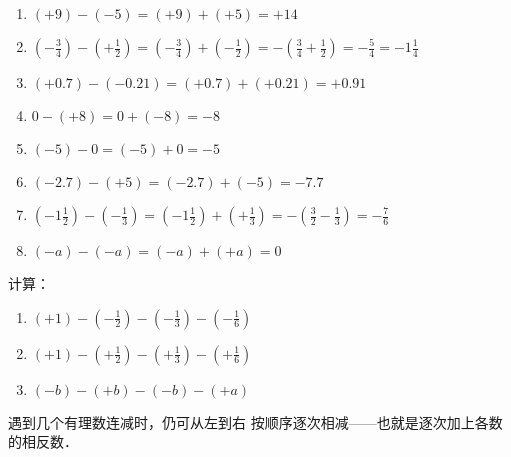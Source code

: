 \begin{solution}
	\begin{enumerate}
		\item $(+9)-(-5)=(+9)+(+5)=+14$
		\item $\left(-\frac{3}{4}\right)-\left(+\frac{1}{2}\right)=\left(-\frac{3}{4}\right)+\left(-\frac{1}{2}\right)=-\left(\frac{3}{4}+\frac{1}{2}\right)=-\frac{5}{4}=-1\frac{1}{4}$
		\item $(+0.7)-(-0.21)=(+0.7)+(+0.21)=+0.91$
		\item $0-(+8)=0+(-8)=-8$
		\item $(-5)-0=(-5)+0=-5$
		\item $(-2.7)-(+5)=(-2.7)+(-5)=-7.7$
		\item $\left(-1\frac{1}{2}\right)-\left(-\frac{1}{3}\right)=\left(-1\frac{1}{2}\right)+\left(+\frac{1}{3}\right)=-\left(\frac{3}{2}-\frac{1}{3}\right)=-\frac{7}{6}$
		\item $(-a)-(-a)=(-a)+(+a)=0$
	\end{enumerate}    
\end{solution}

\begin{example}
	计算：
	\begin{enumerate}
		\item $(+1)-\left(-\frac{1}{2}\right)-\left(-\frac{1}{3}\right)-\left(-\frac{1}{6}\right)$
		\item $(+1)-\left(+\frac{1}{2}\right)-\left(+\frac{1}{3}\right)-\left(+\frac{1}{6}\right)$
		\item $(-b)-(+b)-(-b)-(+a)$
	\end{enumerate}
\end{example}

\begin{analyze}
	遇到几个有理数连减时，仍可从左到右
	按顺序逐次相减——也就是逐次加上各数的相反数．
\end{analyze}

